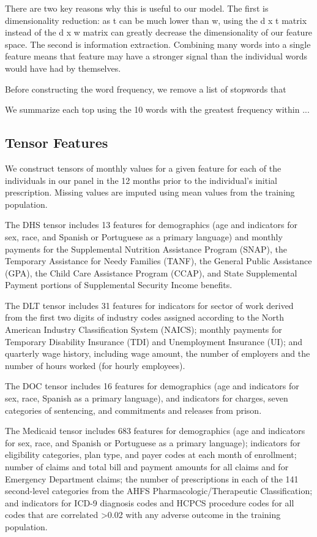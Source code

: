 \documentclass[11pt, letter]{article}
\begin{document}
There are two key reasons why this is useful to our model. The first is dimensionality reduction: as t can be much lower than w, using the d x t matrix instead of the d x w matrix can greatly decrease the dimensionality of our feature space. The second is information extraction. Combining many words into a single feature means that feature may have a stronger signal than the individual words would have had by themselves. 

Before constructing the word frequency, we remove a list of stopwords that 

We summarize each top using the 10 words with the greatest frequency within  ...

\subsection{Tensor Features}

We construct tensors of monthly values for a given feature for each of the individuals in our panel in the 12 months prior to the individual's initial prescription. Missing values are imputed using mean values from the training population.

The DHS tensor includes 13 features for demographics (age and indicators for sex, race, and Spanish or Portuguese as a primary language) and monthly payments for the Supplemental Nutrition Assistance Program (SNAP), the Temporary Assistance for Needy Families (TANF), the General Public Assistance (GPA), the Child Care Assistance Program (CCAP), and State Supplemental Payment portions of Supplemental Security Income benefits.

The DLT tensor includes 31 features for indicators for sector of work derived from the first two digits of industry codes assigned according to the North American Industry Classification System (NAICS); monthly payments for Temporary Disability Insurance (TDI) and Unemployment Insurance (UI); and quarterly wage history, including wage amount, the number of employers and the number of hours worked (for hourly employees).

The DOC tensor includes 16 features for demographics (age and indicators for sex, race, Spanish as a primary language), and indicators for charges, seven categories of sentencing, and commitments and releases from prison.

The Medicaid tensor includes 683 features for demographics (age and indicators for sex, race, and Spanish or Portuguese as a primary language); indicators for eligibility categories, plan type, and payer codes at each month of enrollment; number of claims and total bill and payment amounts for all claims and for Emergency Department claims; the number of prescriptions in each of the 141 second-level categories from the AHFS Pharmacologic/Therapeutic Classification; and indicators for ICD-9 diagnosis codes and HCPCS procedure codes for all codes that are correlated >0.02 with any adverse outcome in the training population.
\end{document}
